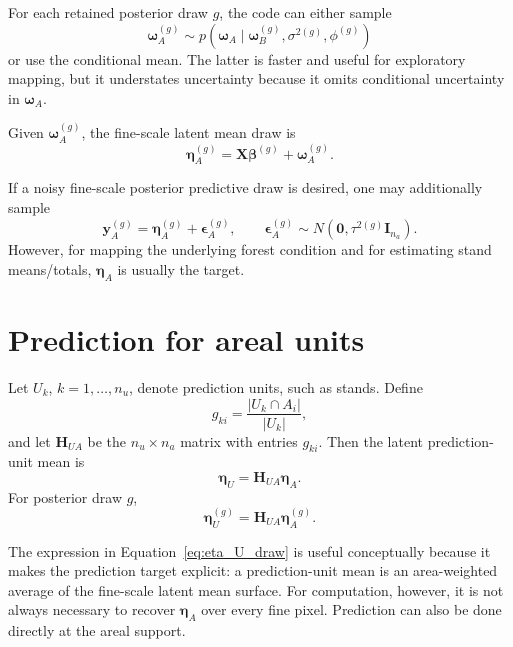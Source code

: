 \documentclass[11pt]{article}
\newcommand{\bsb}{\bm{\beta}}
\newcommand{\bsw}{\bm{\omega}}
\newcommand{\bse}{\bm{\epsilon}}
\begin{document}
For each retained posterior draw $g$, the code can either sample
\begin{equation}
\bsw_A^{(g)} \sim
p(\bsw_A\mid \bsw_B^{(g)},\sigma^{2(g)},\phi^{(g)})
\label{eq:wA_sample}
\end{equation}
or use the conditional mean. The latter is faster and useful for exploratory mapping, but it understates uncertainty because it omits conditional uncertainty in $\bsw_A$.

Given $\bsw_A^{(g)}$, the fine-scale latent mean draw is
\begin{equation}
\bm{\eta}_A^{(g)}
=
\bm{X}\bsb^{(g)}+\bsw_A^{(g)}.
\label{eq:eta_A_draw}
\end{equation}

If a noisy fine-scale posterior predictive draw is desired, one may additionally sample
\begin{equation}
\bm{y}_A^{(g)}
=
\bm{\eta}_A^{(g)}
+
\bse_A^{(g)},
\qquad
\bse_A^{(g)}\sim N(\bm{0},\tau^{2(g)}\bm{I}_{n_a}).
\label{eq:yA_pred}
\end{equation}
However, for mapping the underlying forest condition and for estimating stand means/totals, $\bm{\eta}_A$ is usually the target.

\section{Prediction for areal units}

Let $U_k$, $k=1,\ldots,n_u$, denote prediction units, such as stands. Define
\begin{equation}
g_{ki}
=
\frac{|U_k\cap A_i|}{|U_k|},
\label{eq:gki}
\end{equation}
and let $\bm{H}_{UA}$ be the $n_u\times n_a$ matrix with entries $g_{ki}$. Then the latent prediction-unit mean is
\begin{equation}
\bm{\eta}_U
=
\bm{H}_{UA}\bm{\eta}_A.
\label{eq:eta_U}
\end{equation}
For posterior draw $g$,
\begin{equation}
\bm{\eta}_U^{(g)}
=
\bm{H}_{UA}\bm{\eta}_A^{(g)}.
\label{eq:eta_U_draw}
\end{equation}

The expression in Equation~\eqref{eq:eta_U_draw} is useful conceptually because it makes the prediction target explicit: a prediction-unit mean is an area-weighted average of the fine-scale latent mean surface. For computation, however, it is not always necessary to recover $\bm{\eta}_A$ over every fine pixel. Prediction can also be done directly at the areal support.
\end{document}
